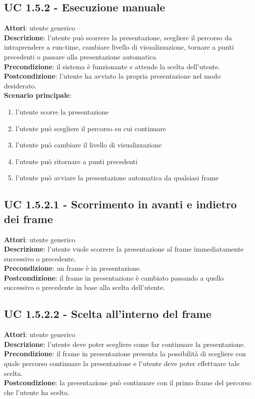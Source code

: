 	\subsection{UC 1.5.2 - Esecuzione manuale}{
		\label{uc1.5.2}
		\textbf{Attori}: utente generico \\
		\textbf{Descrizione}: l'utente può scorrere la presentazione, scegliere il percorso da intraprendere a run-time, cambiare livello di visualizzazione, tornare a punti precedenti o passare alla presentazione automatica \\
		\textbf{Precondizione}: il sistema è funzionante e attende la scelta dell'utente. \\
		\textbf{Postcondizione}: l'utente ha avviato la propria presentazione nel modo desiderato.	\\
		\textbf{Scenario principale}:
		\begin{enumerate}
			\item l'utente scorre la presentazione
			\item l'utente può scegliere il percorso su cui continuare
			\item l'utente può cambiare il livello di visualizzazione
			\item l'utente può ritornare a punti precedenti
			\item l'utente può avviare la presentazione automatica da qualsiasi frame
		\end{enumerate}
		}
	\subsection{UC 1.5.2.1 - Scorrimento in avanti e indietro dei frame}{
		\label{uc1.5.2.1}
		\textbf{Attori}: utente generico \\
		\textbf{Descrizione}: l'utente vuole scorrere la presentazione al frame immediatamente successivo o precedente. \\
		\textbf{Precondizione}: un frame è in presentazione.	\\
		\textbf{Postcondizione}: il frame in presentazione è cambiato passando a quello successivo o precedente in base alla scelta dell'utente.	\\
	}
	\subsection{UC 1.5.2.2 - Scelta all'interno del frame}{
		\label{uc1.5.2.2}
		\textbf{Attori}: utente generico \\
		\textbf{Descrizione}: l'utente deve poter scegliere come far continuare la presentazione. \\
		\textbf{Precondizione}: il frame in presentazione presenta la possibilità di scegliere con quale percorso continuare la presentazione e l'utente deve poter effettuare tale scelta.	\\
		\textbf{Postcondizione}: la presentazione può continuare con il primo frame del percorso che l'utente ha scelto.	\\
	}
